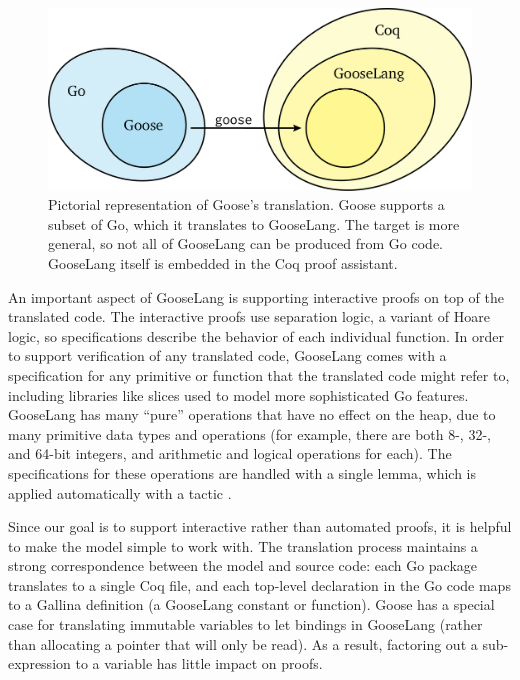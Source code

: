 \begin{figure}
  \includegraphics{fig/goose.png}
  \vspace{0.5\baselineskip}
  \caption[Representation of Goose's translation support]%
  {Pictorial representation of Goose's translation. Goose supports a subset of
    Go, which it translates to GooseLang. The target is more general, so not all
    of GooseLang can be produced from Go code. GooseLang itself is embedded in
    the Coq proof assistant.}
  \label{fig:goose:overview}
\end{figure}

An important aspect of GooseLang is supporting interactive proofs on top
of the translated code. The interactive proofs use separation logic, a
variant of Hoare logic, so specifications describe the behavior of each
individual function. In order to support verification of any translated
code, GooseLang comes with a specification for any primitive or function
that the translated code might refer to, including libraries like slices
used to model more sophisticated Go features. GooseLang has many
``pure'' operations that have no effect on the heap, due to many
primitive data types and operations (for example, there are both 8-,
32-, and 64-bit integers, and arithmetic and logical operations for
each). The specifications for these operations are handled with a single
lemma, which is applied automatically with a tactic .

Since our goal is to support interactive rather than automated proofs,
it is helpful to make the model simple to work with. The translation process maintains
a strong correspondence between the model and source code: each Go
package translates to a single Coq file, and each top-level declaration
in the Go code maps to a Gallina definition (a GooseLang constant or
function). Goose has a special case for translating immutable variables
to let bindings in GooseLang (rather than allocating a pointer that will
only be read). As a result, factoring out a sub-expression to a variable
has little impact on proofs.

